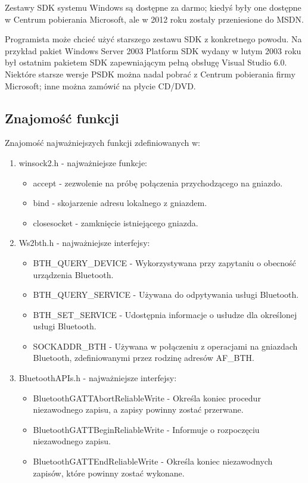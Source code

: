 \documentclass[a4paper,12pt]{extarticle}  %
\begin{document}
Zestawy SDK systemu Windows są dostępne za darmo; kiedyś były one dostępne w Centrum pobierania Microsoft, ale w 2012 roku zostały przeniesione do MSDN.

Programista może chcieć użyć starszego zestawu SDK z konkretnego powodu. Na przykład pakiet Windows Server 2003 Platform SDK wydany w lutym 2003 
roku był ostatnim pakietem SDK zapewniającym pełną obsługę Visual Studio 6.0. Niektóre starsze wersje PSDK można nadal pobrać z Centrum pobierania firmy Microsoft; 
inne można zamówić na płycie CD/DVD. 
\subsection{Znajomość funkcji}
Znajomość najważniejszych funkcji zdefiniowanych w:
\begin{enumerate}
	\item winsock2.h - najważniejsze funkcje:
	\begin{itemize}
		\item accept - zezwolenie na próbę połączenia przychodzącego na gniazdo.
		\item bind - skojarzenie adresu lokalnego z gniazdem.
		\item closesocket - zamknięcie istniejącego gniazda.
	\end{itemize}
	\item Ws2bth.h - najważniejsze interfejsy:
	\begin{itemize}
		\item BTH\_QUERY\_DEVICE - Wykorzystywana przy zapytaniu o obecność urządzenia Bluetooth.
		\item BTH\_QUERY\_SERVICE - Używana do odpytywania usługi Bluetooth.
		\item BTH\_SET\_SERVICE - Udostępnia informacje o usłudze dla określonej usługi Bluetooth.
		\item SOCKADDR\_BTH - Używana w połączeniu z operacjami na gniazdach Bluetooth, zdefiniowanymi przez rodzinę adresów AF\_BTH.
	\end{itemize}
	\item BluetoothAPIs.h - najważniejsze interfejsy:
	\begin{itemize}
		\item BluetoothGATTAbortReliableWrite - Określa koniec procedur niezawodnego zapisu, a zapisy powinny zostać przerwane.
		\item BluetoothGATTBeginReliableWrite - Informuje o rozpoczęciu niezawodnego zapisu.
		\item BluetoothGATTEndReliableWrite - Określa koniec niezawodnych zapisów, które powinny zostać wykonane.

\end{itemize}
\end{enumerate}
\end{document}
